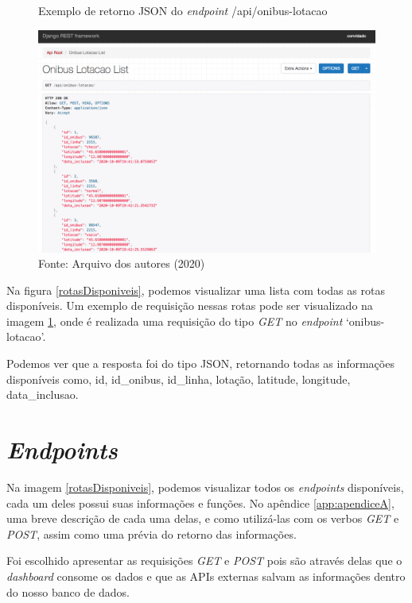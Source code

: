 \begin{figure}[H]
    \centering
    \caption{Exemplo de retorno JSON do \textit{endpoint} /api/onibus-lotacao}
    \includegraphics[width=1.0\linewidth]{Imagens/onibusLotacaoExemplo.png}
    \caption*{Fonte: Arquivo dos autores (2020)}
    \label{onibusLotacaoExemplo}
\end{figure}
\indent
\par Na figura \ref{rotasDisponiveis}, podemos visualizar uma lista com todas as rotas disponíveis. Um exemplo de requisição nessas rotas pode ser visualizado na imagem \ref{onibusLotacaoExemplo}, onde é realizada uma requisição do tipo \textit{GET} no \textit{endpoint} ‘onibus-lotacao’. 
\indent
\par Podemos ver que a resposta foi do tipo JSON, retornando todas as informações disponíveis como, id, id\_onibus, id\_linha, lotação, latitude, longitude, data\_inclusao.

\section{\textit{Endpoints}}
\indent
\par Na imagem \ref{rotasDisponiveis}, podemos visualizar todos os \textit{endpoints} disponíveis, cada um deles possui suas informações e funções. No apêndice \ref{app:apendiceA}, uma breve descrição de cada uma delas, e como utilizá-las com os verbos \textit{GET} e \textit{POST}, assim como uma prévia do retorno das informações.
\indent
\par Foi escolhido apresentar as requisições \textit{GET} e \textit{POST} pois são através delas que o \textit{dashboard} consome os dados e que as APIs externas salvam as informações dentro do nosso banco de dados.

